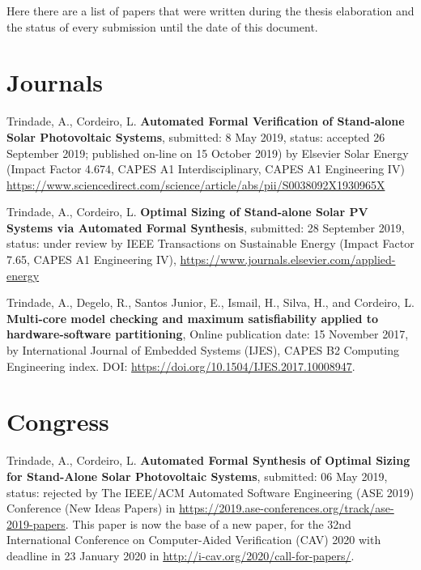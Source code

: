 %
Here there are a list of papers that were written during the thesis elaboration and the status of every submission until the date of this document.


\section{Journals}

Trindade, A., Cordeiro, L. \textbf{Automated Formal Verification of Stand-alone Solar Photovoltaic Systems}, submitted: 8 May 2019, status: accepted 26 September 2019; published on-line on 15 October 2019) by Elsevier Solar Energy (Impact Factor 4.674, CAPES A1 Interdisciplinary, CAPES A1 Engineering IV) \url{https://www.sciencedirect.com/science/article/abs/pii/S0038092X1930965X}

Trindade, A., Cordeiro, L. \textbf{Optimal Sizing of Stand-alone Solar PV Systems via Automated Formal Synthesis}, submitted: 28 September 2019, status: under review by IEEE Transactions on Sustainable Energy (Impact Factor 7.65, CAPES A1 Engineering IV), \url{https://www.journals.elsevier.com/applied-energy}

Trindade, A., Degelo, R., Santos Junior, E., Ismail, H., Silva, H., and Cordeiro, L. \textbf{Multi-core model checking and maximum satisfiability applied to hardware-software partitioning}, Online publication date: 15 November 2017, by International Journal of Embedded Systems (IJES), CAPES B2 Computing Engineering index. DOI:   \url {https://doi.org/10.1504/IJES.2017.10008947}.


\section{Congress}

Trindade, A., Cordeiro, L. \textbf{Automated Formal Synthesis of Optimal Sizing for Stand-Alone Solar Photovoltaic Systems}, submitted: 06 May 2019, status: rejected by The IEEE/ACM Automated Software Engineering (ASE 2019) Conference (New Ideas Papers) in \url{https://2019.ase-conferences.org/track/ase-2019-papers}. This paper is now the base of a new paper, for the 32nd International Conference on Computer-Aided Verification (CAV) 2020 with deadline in 23 January 2020 in \url{http://i-cav.org/2020/call-for-papers/}.

